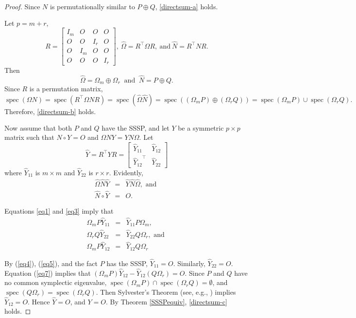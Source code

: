 \documentclass[12pt]{article}
\theoremstyle{definition}
\theoremstyle{definition}
\theoremstyle{definition}
\numberwithin{figure}{section}
\numberwithin{equation}{section}
\newcommand{\trans}{^{\top}}
\newcommand{\mtx}[1]{\begin{bmatrix} #1 \end{bmatrix}}
\newcommand{\spec}{\operatorname{spec}}
\newcommand{\x}{\times}
\newcommand{\beq}{\begin{equation}}
\newcommand{\eeq}{\end{equation}}
\newcommand{\wh}{\widehat}
\begin{document}
\begin{proof} 
Since $N$ is permutationally similar to $P\oplus Q$, \eqref{directsum-a} holds. 

Let $p=m+r$, 
\[R= \mtx{
I_m & O & O & O \\ 
O & O & I_r & O \\  
O & I_m & O & O \\ 
O & O & O & I_r
} \!\!, \ \widehat{\Omega}= R\trans \Omega R, \  \mbox{and} \ \widehat{N}= R\trans N R.\] 
Then 
\beq \label{eq1} \widehat{\Omega}=
\Omega_m \oplus \Omega_r \ \mbox{ and }\  \widehat{N}= P \oplus Q .\eeq 
Since $R$ is a permutation matrix,  
\[ \spec(\Omega N)=\spec(R\trans \Omega N R)=\spec(\wh \Omega \wh N) =\spec((\Omega_m P)\oplus ( \Omega_r Q))=\spec(\Omega_m P)\cup \spec(\Omega_r Q).\]
Therefore, \eqref{directsum-b} holds. 


Now assume that both $P$ and $Q$ have the SSSP, and let $Y$ be a symmetric  $p\x p$ matrix such that $N \circ Y=O$
and  $\Omega N Y = Y N \Omega$.
Let 
\[\widehat{Y} = R\trans Y R = \mtx{\widehat{Y}_{11} & \widehat{Y}_{12} \\ 
{\widehat{Y}_{12}}\trans & \widehat{Y}_{22}}
\]
where $\wh Y_{11}$ is $m\x m$ and $\wh Y_{22}$ is $r\x r$.  Evidently, 
\begin{eqnarray}
\label{eq3}
 \widehat{\Omega} \widehat{N}\widehat{Y}&=&\widehat{Y}\widehat{N}\widehat{\Omega}, \mbox{ and }
\\
\label{eq4} 
\widehat{N} \circ \widehat{Y}& =&O.
\end{eqnarray} 


Equations \eqref{eq1} and \eqref{eq3} imply that 
\begin{eqnarray}
\label{eq5}
\Omega_m P\widehat{Y}_{11} &=& 
\widehat{Y}_{11}P\Omega_m, \\
\label{eq6}
\Omega_r Q\widehat{Y}_{22}  &= &  
\widehat{Y}_{22}Q\Omega_r, \mbox{ and }\\
\label{eq7} 
 \Omega_m P \widehat{Y}_{12} & = &  \widehat{Y}_{12} Q \Omega_r  
\end{eqnarray}

By (\ref{eq4}), (\ref{eq5}), and the fact $P$ has the SSSP, 
$\widehat{Y}_{11}=O$.  Similarly, 
$\widehat{Y}_{22}=O$.  Equation (\ref{eq7}) 
implies that $(\Omega_m P) \widehat{Y}_{12}  -  \widehat{Y}_{12} (Q \Omega_r)=O$.
  Since $P$ and $Q$ have no common symplectic eigenvalue, $\spec(\Omega_m P)\cap \spec(\Omega_r Q)=\emptyset$, and $\spec(Q \Omega_r)=\spec( \Omega_r Q)$.
Then Sylvester's Theorem (see, e.g.,  \cite[Theorem 2.4.4.1]{HJ}) implies $\widehat{Y}_{12}=O$. Hence $\widehat{Y}=O$, and $Y=O$. By Theorem \ref{SSSPequiv}, \eqref{directsum-c} holds.
\end{proof} 
\end{document}

